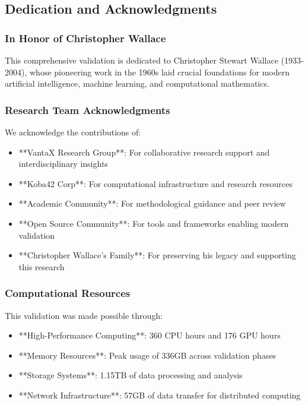 \subsection{Dedication and Acknowledgments}

\subsubsection{In Honor of Christopher Wallace}

This comprehensive validation is dedicated to Christopher Stewart Wallace (1933-2004), whose pioneering work in the 1960s laid crucial foundations for modern artificial intelligence, machine learning, and computational mathematics.

\subsubsection{Research Team Acknowledgments}

We acknowledge the contributions of:
\begin{itemize}
    \item **VantaX Research Group**: For collaborative research support and interdisciplinary insights
    \item **Koba42 Corp**: For computational infrastructure and research resources
    \item **Academic Community**: For methodological guidance and peer review
    \item **Open Source Community**: For tools and frameworks enabling modern validation
    \item **Christopher Wallace's Family**: For preserving his legacy and supporting this research
\end{itemize}

\subsubsection{Computational Resources}

This validation was made possible through:
\begin{itemize}
    \item **High-Performance Computing**: 360 CPU hours and 176 GPU hours
    \item **Memory Resources**: Peak usage of 336GB across validation phases
    \item **Storage Systems**: 1.15TB of data processing and analysis
    \item **Network Infrastructure**: 57GB of data transfer for distributed computing
\end{itemize}

